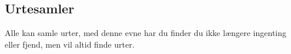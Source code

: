 \subsection{Urtesamler}
Alle kan samle urter, med denne evne har du finder du ikke længere ingenting eller fjend, men vil altid finde urter.